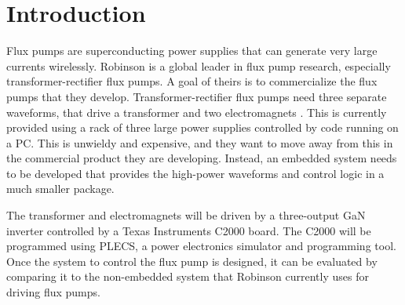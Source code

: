 \documentclass[11pt, a4paper, twoside, openright]{article}
\begin{document}


\section{Introduction}

Flux pumps are superconducting power supplies that can generate very large currents wirelessly. Robinson is a global leader in flux pump research, especially transformer-rectifier flux pumps. A goal of theirs is to commercialize the flux pumps that they develop. Transformer-rectifier flux pumps need three separate waveforms, that drive a transformer and two electromagnets \cite{fpreview}. This is currently provided using a rack of three large power supplies controlled by code running on a PC. This is unwieldy and expensive, and they want to move away from this in the commercial product they are developing. Instead, an embedded system needs to be developed that provides the high-power waveforms and control logic in a much smaller package.

The transformer and electromagnets will be driven by a three-output GaN inverter controlled by a Texas Instruments C2000 board. The C2000 will be programmed using PLECS, a power electronics simulator and programming tool. Once the system to control the flux pump is designed, it can be evaluated by comparing it to the non-embedded system that Robinson currently uses for driving flux pumps.




\end{document}
